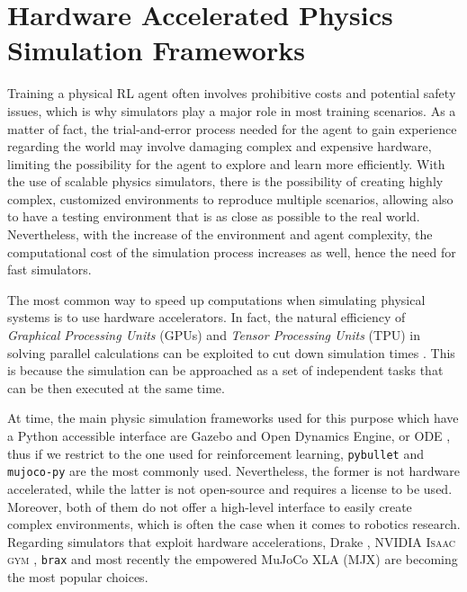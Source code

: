 \chapter{Hardware Accelerated Physics Simulation Frameworks}
\label{chp:back_PhysicsSimulators}

Training a physical \ac{RL} agent often involves prohibitive costs and potential safety issues, which is why simulators play a major role in most training scenarios. As a matter of fact, the trial-and-error process needed for the agent to gain experience regarding the world may involve damaging complex and expensive hardware, limiting the possibility for the agent to explore and learn more efficiently. With the use of scalable physics simulators, there is the possibility of creating highly complex, customized environments to reproduce multiple scenarios, allowing also to have a testing environment that is as close as possible to the real world. Nevertheless, with the increase of the environment and agent complexity, the computational cost of the simulation process increases as well, hence the need for fast simulators.

The most common way to speed up computations when simulating physical systems is to use hardware accelerators. In fact, the natural efficiency of \textit{Graphical Processing Units} (\ac{GPU}s) and \textit{Tensor Processing Units} (\ac{TPU}) in solving parallel calculations can be exploited to cut down simulation times \citep{liang_gpu-accelerated_2018}. This is because the simulation can be approached as a set of independent tasks that can be then executed at the same time.

At time, the main physic simulation frameworks used for this purpose which have a Python accessible interface are Gazebo \citep{Koenig2004} and Open Dynamics Engine, or ODE \citep{ode:2008} \citep{erez_simulation_2015,ivaldi:hal-01116148}, thus if we restrict to the one used for reinforcement learning, \texttt{pybullet} \citep{coumans_pybullet_2016} and \texttt{mujoco-py} \citep{todorov_mujoco_2012} are the most commonly used. Nevertheless, the former is not hardware accelerated, while the latter is not open-source and requires a license to be used. Moreover, both of them do not offer a high-level interface to easily create complex environments, which is often the case when it comes to robotics research.
Regarding simulators that exploit hardware accelerations, Drake
\citep{drake}, NVIDIA \textsc{Isaac gym} \citep{makoviychuk_isaac_2021}, \texttt{brax} \citep{freeman_brax_2021} and most recently the \jax empowered MuJoCo XLA (MJX) are becoming the most popular choices.

